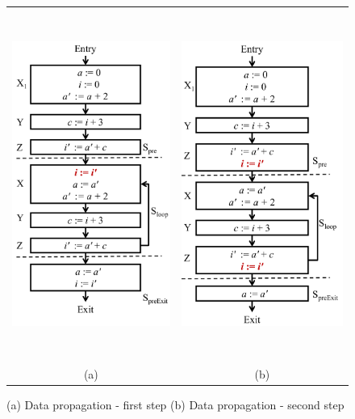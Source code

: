 \begin{figure}[t!]
\begin{center}
\begin{tabular}{cc}
\includegraphics[height=4.5in]{fig-proposal/algorithm-after-data-propagation-1}
&
\includegraphics[height=4.5in]{fig-proposal/algorithm-after-data-propagation-2}
\\
(a) & (b)
\\
\end{tabular}
\end{center}
\caption{(a) Data propagation - first step (b) Data propagation - second step}
\label{fig:algo2-2}
\end{figure}

